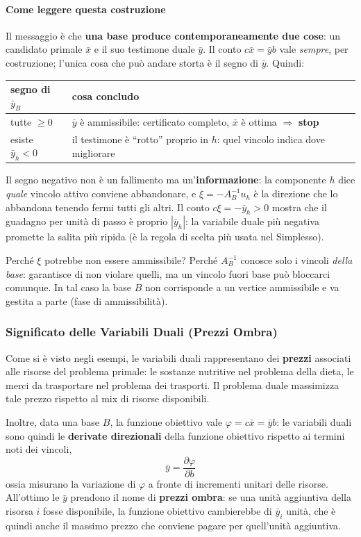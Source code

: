 \documentclass[12pt]{extarticle} %
\begin{document}
\paragraph{Come leggere questa costruzione}
Il messaggio è che \textbf{una base produce contemporaneamente due cose}: un candidato primale $\bar{x}$ e il suo testimone duale $\bar{y}$. Il conto $c\bar{x} = \bar{y}b$ vale \emph{sempre}, per costruzione; l'unica cosa che può andare storta è il segno di $\bar{y}$. Quindi:
\begin{center}
\begin{tabular}{ll}
\hline
\textbf{segno di $\bar{y}_B$} & \textbf{cosa concludo} \\
\hline
tutte $\ge 0$ & $\bar{y}$ è ammissibile: certificato completo, $\bar{x}$ è ottima $\Rightarrow$ \textbf{stop} \\
esiste $\bar{y}_h < 0$ & il testimone è ``rotto'' proprio in $h$: quel vincolo indica dove migliorare \\
\hline
\end{tabular}
\end{center}
Il segno negativo non è un fallimento ma un'\textbf{informazione}: la componente $h$ dice \emph{quale} vincolo attivo conviene abbandonare, e $\xi = -A_B^{-1}u_h$ è la direzione che lo abbandona tenendo fermi tutti gli altri. Il conto $c\xi = -\bar{y}_h > 0$ mostra che il guadagno per unità di passo è proprio $|\bar{y}_h|$: la variabile duale più negativa promette la salita più ripida (è la regola di scelta più usata nel Simplesso).

\noindent Perché $\xi$ potrebbe non essere ammissibile? Perché $A_B^{-1}$ conosce solo i vincoli \emph{della base}: garantisce di non violare quelli, ma un vincolo fuori base può bloccarci comunque. In tal caso la base $B$ non corrisponde a un vertice ammissibile e va gestita a parte (fase di ammissibilità).

\subsubsection{Significato delle Variabili Duali (Prezzi Ombra)}
Come si è visto negli esempi, le variabili duali rappresentano dei \textbf{prezzi} associati alle risorse del problema primale: le sostanze nutritive nel problema della dieta, le merci da trasportare nel problema dei trasporti. Il problema duale massimizza tale prezzo rispetto al mix di risorse disponibili.

\noindent Inoltre, data una base $B$, la funzione obiettivo vale $\varphi = c\bar{x} = \bar{y}b$: le variabili duali sono quindi le \textbf{derivate direzionali} della funzione obiettivo rispetto ai termini noti dei vincoli,
\[
\bar{y} = \frac{\partial \varphi}{\partial b}
\]
ossia misurano la variazione di $\varphi$ a fronte di incrementi unitari delle risorse. All'ottimo le $\bar{y}$ prendono il nome di \textbf{prezzi ombra}: se una unità aggiuntiva della risorsa $i$ fosse disponibile, la funzione obiettivo cambierebbe di $\bar{y}_i$ unità, che è quindi anche il massimo prezzo che conviene pagare per quell'unità aggiuntiva.
\end{document}
